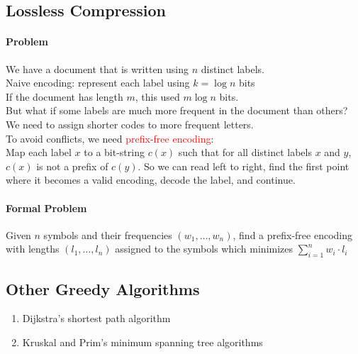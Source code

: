 \documentclass[11pt]{article}
\begin{document}
\subsection{Lossless Compression}
\paragraph{Problem}
We have a document that is written using $n$ distinct labels. \\
Naive encoding: represent each label using $k = \log n$ bits \\
If the document has length $m$, this used $m \log n$ bits. \\
But what if some labels are much more frequent in the document than others? We need to assign shorter codes to more frequent letters. \\
To avoid conflicts, we need \textcolor{red}{prefix-free encoding}: \\
Map each label $x$ to a bit-string $c(x)$ such that for all distinct labels $x$ and $y$, $c(x)$ is not a prefix of $c(y)$. So we can read left to right, find the first point where it becomes a valid encoding, decode the label, and continue.
\paragraph{Formal Problem}
Given $n$ symbols and their frequencies $(w_1, \hdots, w_n)$, find a prefix-free encoding with lengths $(l_1, \hdots, l_n)$ assigned to the symbols which minimizes $\sum_{i=1}^n w_i \cdot l_i$


\subsection{Other Greedy Algorithms}
\begin{enumerate}
	\item Dijkstra's shortest path algorithm
	\item Kruskal and Prim's minimum spanning tree algorithms
\end{enumerate}
\end{document}
